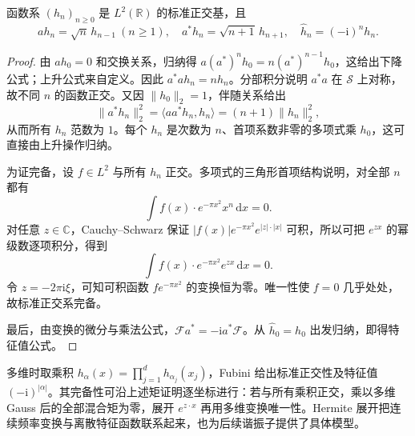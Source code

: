 \begin{theorem}\label{b2:thm:05-hermite}
函数系 \((h_n)_{n\geq0}\) 是 \(L^2(\mathbb R)\) 的标准正交基，且
\[
 ah_n=\sqrt n\,h_{n-1}\ (n\geq1),\quad
 a^*h_n=\sqrt{n+1}\,h_{n+1},\quad
 \widehat h_n=(-\mathrm{i})^nh_n.
\]
\end{theorem}
\begin{proof}
由 \(ah_0=0\) 和交换关系，归纳得 \(a(a^*)^nh_0=n(a^*)^{n-1}h_0\)，这给出下降公式；上升公式来自定义。因此 \(a^*ah_n=nh_n\)。分部积分说明 \(a^*a\) 在 \(\mathcal S\) 上对称，故不同 \(n\) 的函数正交。又因 \(\|h_0\|_2=1\)，伴随关系给出
\[
 \|a^*h_n\|_2^2=\langle aa^*h_n,h_n\rangle
 =(n+1)\|h_n\|_2^2,
\]
从而所有 \(h_n\) 范数为 \(1\)。每个 \(h_n\) 是次数为 \(n\)、首项系数非零的多项式乘 \(h_0\)，这可直接由上升操作归纳。

为证完备，设 \(f\in L^2\) 与所有 \(h_n\) 正交。多项式的三角形首项结构说明，对全部 \(n\) 都有
\[
 \int f(x)\cdot e^{-\pi x^2}x^n\,\mathrm{d}x=0.
\]
对任意 \(z\in\mathbb C\)，Cauchy--Schwarz 保证 \(|f(x)|e^{-\pi x^2}e^{|z|\cdot|x|}\) 可积，所以可把 \(e^{zx}\) 的幂级数逐项积分，得到
\[
 \int f(x)\cdot e^{-\pi x^2}e^{zx}\,\mathrm{d}x=0.
\]
令 \(z=-2\pi\mathrm{i}\xi\)，可知可积函数 \(fe^{-\pi x^2}\) 的变换恒为零。唯一性使 \(f=0\) 几乎处处，故标准正交系完备。

最后，由变换的微分与乘法公式，\(\mathcal F a^*=-\mathrm{i}a^*\mathcal F\)。从 \(\widehat h_0=h_0\) 出发归纳，即得特征值公式。
\end{proof}

多维时取乘积 \(h_\alpha(x)=\prod_{j=1}^dh_{\alpha_j}(x_j)\)，Fubini 给出标准正交性及特征值 \((-\mathrm{i})^{|\alpha|}\)。其完备性可沿上述矩证明逐坐标进行：若与所有乘积正交，乘以多维 Gauss 后的全部混合矩为零，展开 \(e^{z\cdot x}\) 再用多维变换唯一性。Hermite 展开把连续频率变换与离散特征函数联系起来，也为后续谐振子提供了具体模型。
